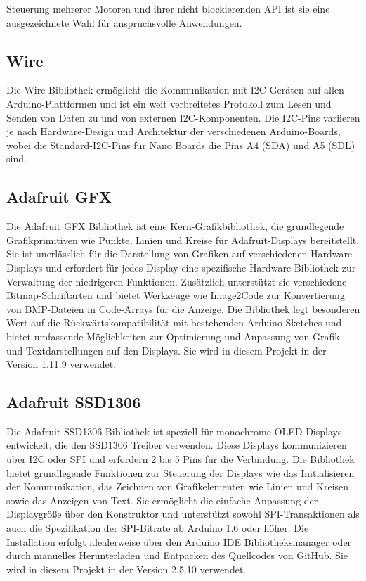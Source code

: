{{{Steuerung mehrerer Motoren und ihrer nicht blockierenden API ist sie eine ausgezeichnete Wahl für anspruchsvolle Anwendungen.\cite{McCauley:2024,McCauley:2024b}
			
			\subsection {Wire}
			
			Die Wire Bibliothek ermöglicht die Kommunikation mit I2C-Geräten auf allen Arduino-Plattformen und ist ein weit verbreitetes Protokoll zum Lesen und Senden von Daten zu und von externen I2C-Komponenten. Die I2C-Pins variieren je nach Hardware-Design und Architektur der verschiedenen Arduino-Boards, wobei die Standard-I2C-Pins für Nano Boards die Pins A4 (SDA) und A5 (SDL) sind.
			
			\subsection{Adafruit GFX}
			
			Die Adafruit GFX Bibliothek ist eine Kern-Grafikbibliothek, die grundlegende Grafikprimitiven wie Punkte, Linien und Kreise für Adafruit-Displays bereitstellt. Sie ist unerlässlich für die Darstellung von Grafiken auf verschiedenen Hardware-Displays und erfordert für jedes Display eine spezifische Hardware-Bibliothek zur Verwaltung der niedrigeren Funktionen. Zusätzlich unterstützt sie verschiedene Bitmap-Schriftarten und bietet Werkzeuge wie Image2Code zur Konvertierung von BMP-Dateien in Code-Arrays für die Anzeige. Die Bibliothek legt besonderen Wert auf die Rückwärtskompatibilität mit bestehenden Arduino-Sketches und bietet umfassende Möglichkeiten zur Optimierung und Anpassung von Grafik- und Textdarstellungen auf den Displays. Sie wird in diesem Projekt in der Version 1.11.9 verwendet.\cite{AdafruitIndustries:2024}
			
			\subsection{Adafruit SSD1306}
			
			Die Adafruit SSD1306 Bibliothek ist speziell für monochrome OLED-Displays entwickelt, die den SSD1306 Treiber verwenden. Diese Displays kommunizieren über I2C oder SPI und erfordern 2 bis 5 Pins für die Verbindung. Die Bibliothek bietet grundlegende Funktionen zur Steuerung der Displays wie das Initialisieren der Kommunikation, das Zeichnen von Grafikelementen wie Linien und Kreisen sowie das Anzeigen von Text. Sie ermöglicht die einfache Anpassung der Displaygröße über den Konstruktor und unterstützt sowohl SPI-Transaktionen als auch die Spezifikation der SPI-Bitrate ab Arduino 1.6 oder höher. Die Installation erfolgt idealerweise über den Arduino IDE Bibliotheksmanager oder durch manuelles Herunterladen und Entpacken des Quellcodes von GitHub. Sie wird in diesem Projekt in der Version 2.5.10 verwendet.\cite{AdafruitIndustries:2024b}
			
}}}
